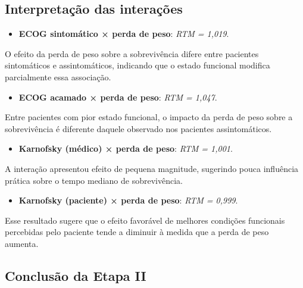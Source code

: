 \documentclass[
  brazilian,
  letterpaper,
  DIV=11,
  numbers=noendperiod]{scrartcl}
\providecommand{\tightlist}{%
  \setlength{\itemsep}{0pt}\setlength{\parskip}{0pt}}
\begin{document}
\subsection{\texorpdfstring{\textbf{Interpretação das
interações}}{Interpretação das interações}}\label{interpretauxe7uxe3o-das-interauxe7uxf5es}

\begin{itemize}
\tightlist
\item
  \textbf{ECOG sintomático × perda de peso}: \emph{RTM = 1,019}.
\end{itemize}

O efeito da perda de peso sobre a sobrevivência difere entre pacientes
sintomáticos e assintomáticos, indicando que o estado funcional modifica
parcialmente essa associação.

\begin{itemize}
\tightlist
\item
  \textbf{ECOG acamado × perda de peso}: \emph{RTM = 1,047}.
\end{itemize}

Entre pacientes com pior estado funcional, o impacto da perda de peso
sobre a sobrevivência é diferente daquele observado nos pacientes
assintomáticos.

\begin{itemize}
\tightlist
\item
  \textbf{Karnofsky (médico) × perda de peso}: \emph{RTM = 1,001}.
\end{itemize}

A interação apresentou efeito de pequena magnitude, sugerindo pouca
influência prática sobre o tempo mediano de sobrevivência.

\begin{itemize}
\tightlist
\item
  \textbf{Karnofsky (paciente) × perda de peso}: \emph{RTM = 0,999}.
\end{itemize}

Esse resultado sugere que o efeito favorável de melhores condições
funcionais percebidas pelo paciente tende a diminuir à medida que a
perda de peso aumenta.

\subsection{\texorpdfstring{\textbf{Conclusão da Etapa
II}}{Conclusão da Etapa II}}\label{conclusuxe3o-da-etapa-ii}
\end{document}
